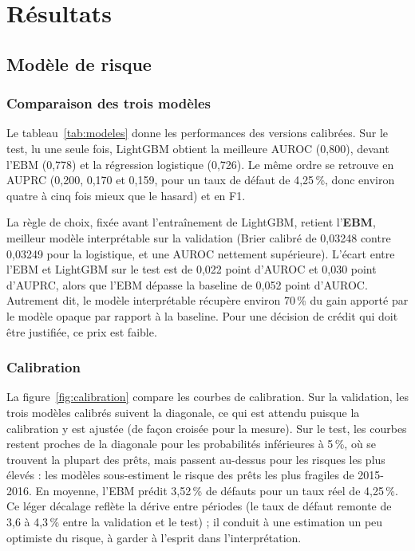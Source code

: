 \chapter{Résultats}\label{chap:resultats}

\section{Modèle de risque}

\subsection{Comparaison des trois modèles}

Le tableau~\ref{tab:modeles} donne les performances des versions calibrées. Sur le test, lu une seule fois, LightGBM
obtient la meilleure AUROC (0,800), devant l'EBM (0,778) et la régression logistique (0,726). Le même ordre se retrouve
en AUPRC (0,200, 0,170 et 0,159, pour un taux de défaut de 4,25\,\%, donc environ quatre à cinq fois mieux que le
hasard) et en F1.



\begin{encadre}
La règle de choix, fixée avant l'entraînement de LightGBM, retient l'\textbf{EBM}, meilleur modèle interprétable sur
la validation (Brier calibré de 0,03248 contre 0,03249 pour la logistique, et une AUROC nettement supérieure). L'écart
entre l'EBM et LightGBM sur le test est de 0,022 point d'AUROC et 0,030 point d'AUPRC, alors que l'EBM dépasse la
baseline de 0,052 point d'AUROC. Autrement dit, le modèle interprétable récupère environ 70\,\% du gain apporté par le
modèle opaque par rapport à la baseline. Pour une décision de crédit qui doit être justifiée, ce prix est faible.
\end{encadre}

\subsection{Calibration}

La figure~\ref{fig:calibration} compare les courbes de calibration. Sur la validation, les trois modèles calibrés
suivent la diagonale, ce qui est attendu puisque la calibration y est ajustée (de façon croisée pour la mesure). Sur
le test, les courbes restent proches de la diagonale pour les probabilités inférieures à 5\,\%, où se trouvent la
plupart des prêts, mais passent au-dessus pour les risques les plus élevés : les modèles sous-estiment le risque des
prêts les plus fragiles de 2015-2016. En moyenne, l'EBM prédit 3,52\,\% de défauts pour un taux réel de 4,25\,\%. Ce
léger décalage reflète la dérive entre périodes (le taux de défaut remonte de 3,6 à 4,3\,\% entre la validation et le
test) ; il conduit à une estimation un peu optimiste du risque, à garder à l'esprit dans l'interprétation.

